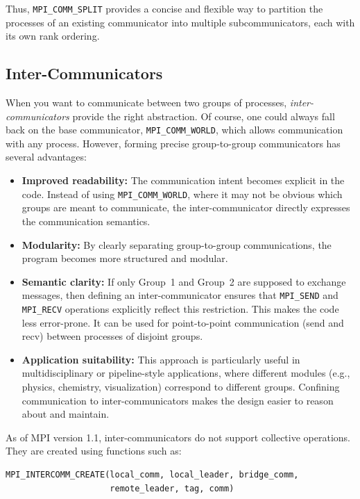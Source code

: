 \documentclass[12pt]{book}
\begin{document}
Thus, \texttt{MPI\_COMM\_SPLIT} provides a concise and flexible way to partition the processes of an existing communicator into multiple subcommunicators, each with its own rank ordering.

\subsection{Inter-Communicators}
When you want to communicate between two groups of processes, \textit{inter-communicators} provide the right abstraction.  
Of course, one could always fall back on the base communicator, \texttt{MPI\_COMM\_WORLD}, which allows communication with any process. However, forming precise group-to-group communicators has several advantages:

\begin{itemize}
    \item \textbf{Improved readability:} The communication intent becomes explicit in the code. Instead of using \texttt{MPI\_COMM\_WORLD}, where it may not be obvious which groups are meant to communicate, the inter-communicator directly expresses the communication semantics.
    \item \textbf{Modularity:} By clearly separating group-to-group communications, the program becomes more structured and modular.
    \item \textbf{Semantic clarity:} If only Group~1 and Group~2 are supposed to exchange messages, then defining an inter-communicator ensures that \texttt{MPI\_SEND} and \texttt{MPI\_RECV} operations explicitly reflect this restriction. This makes the code less error-prone. It can be used for point-to-point communication (send and recv) between processes of disjoint groups.
    \item \textbf{Application suitability:} This approach is particularly useful in multidisciplinary or pipeline-style applications, where different modules (e.g., physics, chemistry, visualization) correspond to different groups. Confining communication to inter-communicators makes the design easier to reason about and maintain.
\end{itemize}

As of MPI version 1.1, inter-communicators do not support collective operations. They are created using functions such as:

\begin{lstlisting}[style=cppstyle]
MPI_INTERCOMM_CREATE(local_comm, local_leader, bridge_comm, 
                     remote_leader, tag, comm)
\end{lstlisting}
\end{document}
